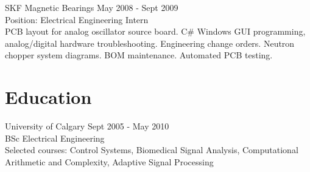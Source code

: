 \documentclass{article}
\begin{document}
SKF Magnetic Bearings \hrulefill May 2008 - Sept 2009 \\
\small Position: Electrical Engineering Intern \\
PCB layout for analog oscillator source board. C\# Windows GUI programming, analog/digital hardware troubleshooting. Engineering change orders. Neutron chopper system diagrams. BOM maintenance. Automated PCB testing. \normalsize \\

\section*{\large Education \normalsize}
\normalsize University of Calgary \hrulefill Sept 2005 - May 2010  \\
\small BSc Electrical Engineering \\
Selected courses: Control Systems, Biomedical Signal Analysis, Computational Arithmetic and Complexity, Adaptive Signal Processing
\end{document}
